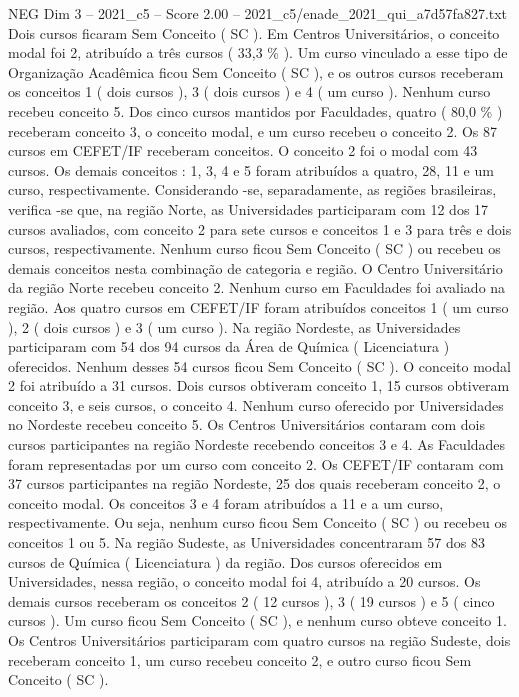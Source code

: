 \begin{textsample}{NEG Dim 3 – 2021\_c5 – Score 2.00 – 2021\_c5/enade\_2021\_qui\_a7d57fa827.txt}
Dois cursos ficaram Sem Conceito ( SC ).
Em Centros Universitários, o conceito modal foi 2, atribuído a três cursos ( 33,3 \% ).
Um curso vinculado a esse tipo de Organização Acadêmica ficou Sem Conceito ( SC ), e os outros cursos receberam os conceitos 1 ( dois cursos ), 3 ( dois cursos ) e 4 ( um curso ).
Nenhum curso recebeu conceito 5.
Dos cinco cursos mantidos por Faculdades, quatro ( 80,0 \% ) receberam conceito 3, o conceito modal, e um curso recebeu o conceito 2.
Os 87 cursos em CEFET/IF receberam conceitos.
O conceito 2 foi o modal com 43 cursos.
Os demais conceitos : 1, 3, 4 e 5 foram atribuídos a quatro, 28, 11 e um curso, respectivamente.
Considerando -se, separadamente, as regiões brasileiras, verifica -se que, na região Norte, as Universidades participaram com 12 dos 17 cursos avaliados, com conceito 2 para sete cursos e conceitos 1 e 3 para três e dois cursos, respectivamente.
Nenhum curso ficou Sem Conceito ( SC ) ou recebeu os demais conceitos nesta combinação de categoria e região.
O Centro Universitário da região Norte recebeu conceito 2.
Nenhum curso em Faculdades foi avaliado na região.
Aos quatro cursos em CEFET/IF foram atribuídos conceitos 1 ( um curso ), 2 ( dois cursos ) e 3 ( um curso ).
Na região Nordeste, as Universidades participaram com 54 dos 94 cursos da Área de Química ( Licenciatura ) oferecidos.
Nenhum desses 54 cursos ficou Sem Conceito ( SC ).
O conceito modal 2 foi atribuído a 31 cursos.
Dois cursos obtiveram conceito 1, 15 cursos obtiveram conceito 3, e seis cursos, o conceito 4.
Nenhum curso oferecido por Universidades no Nordeste recebeu conceito 5.
Os Centros Universitários contaram com dois cursos participantes na região Nordeste recebendo conceitos 3 e 4.
As Faculdades foram representadas por um curso com conceito 2.
Os CEFET/IF contaram com 37 cursos participantes na região Nordeste, 25 dos quais receberam conceito 2, o conceito modal.
Os conceitos 3 e 4 foram atribuídos a 11 e a um curso, respectivamente.
Ou seja, nenhum curso ficou Sem Conceito ( SC ) ou recebeu os conceitos 1 ou 5.
Na região Sudeste, as Universidades concentraram 57 dos 83 cursos de Química ( Licenciatura ) da região.
Dos cursos oferecidos em Universidades, nessa região, o conceito modal foi 4, atribuído a 20 cursos.
Os demais cursos receberam os conceitos 2 ( 12 cursos ), 3 ( 19 cursos ) e 5 ( cinco cursos ).
Um curso ficou Sem Conceito ( SC ), e nenhum curso obteve conceito 1.
Os Centros Universitários participaram com quatro cursos na região Sudeste, dois receberam conceito 1, um curso recebeu conceito 2, e outro curso ficou Sem Conceito ( SC ).

\end{textsample}
